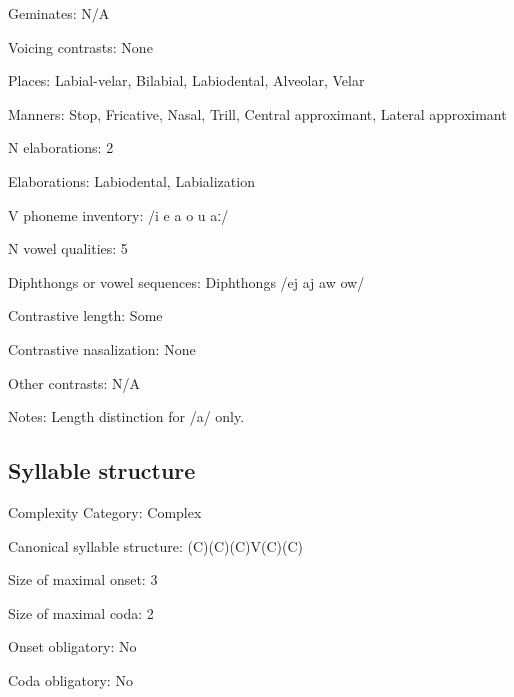{\begin{appendixdesc}
\item[Geminates:] N/A

\item[Voicing contrasts:] None

\item[Places:] Labial-velar, Bilabial, Labiodental, Alveolar, Velar

\item[Manners:] Stop, Fricative, Nasal, Trill, Central approximant, Lateral approximant

\item[N elaborations:] 2

\item[Elaborations:] Labiodental, Labialization

\item[V phoneme inventory:] /i e a o u aː/

\item[N vowel qualities:] 5

\item[Diphthongs or vowel sequences:] Diphthongs /ej aj aw ow/

\item[Contrastive length:] Some

\item[Contrastive nasalization:] None

\item[Other contrasts:] N/A

\item[Notes:] Length distinction for /a/ only.
\end{appendixdesc}
\subsection*{Syllable structure}
\begin{appendixdesc}

\item[Complexity Category:] Complex

\item[Canonical syllable structure:] (C)(C)(C)V(C)(C) \citep[41--48]{Lacrampe2014}

\item[Size of maximal onset:] 3

\item[Size of maximal coda:] 2

\item[Onset obligatory:] No

\item[Coda obligatory:] No


\end{appendixdesc}}
